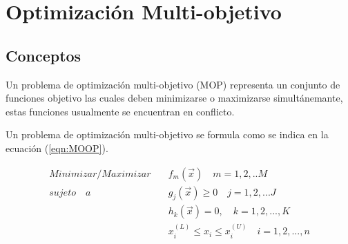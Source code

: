 
\chapter{Optimización Multi-objetivo} %

\label{Chapter2} %



\section{Conceptos}
Un problema de optimización multi-objetivo (MOP) representa un conjunto de funciones objetivo las cuales deben minimizarse o maximizarse simultánemante, estas funciones usualmente se encuentran en conflicto.
%

Un problema de optimización multi-objetivo se formula como se indica en la ecuación (\ref{eqn:MOOP}).

\begin{equation}
\begin{split}
Minimizar/Maximizar \quad &f_m(\vec{x}) \quad m=1,2, ..M \\
sujeto\quad a \quad &g_j(\vec{x}) \geq 0 \quad j = 1,2, ... J\\
&h_k(\vec{x}) = 0, \quad k=1,2, ..., K\\
&x_i^{(L)} \leq x_i \leq x_i^{(U)} \quad i = 1,2, ..., n
\end{split}
\label{eqn:MOOP}
\end{equation}

